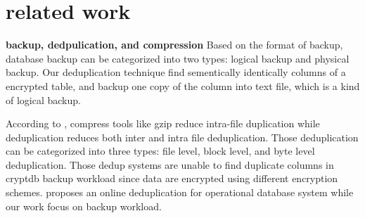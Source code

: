 \section{related work}



\textbf{backup, dedpulication, and compression} Based on the format of backup, database backup can be categorized into two types: logical backup and physical backup\citep{mysqlbackup}. Our deduplication technique find sementically identically columns of a encrypted table, and backup one copy of the column into text file, which is a kind of logical backup. 


According to \citep{mandagere2008demystifying}, compress tools like gzip reduce intra-file duplication while deduplication reduces both inter and intra file deduplication. 
Those deduplication can be categorized into three types: file level, block level, and byte level deduplication. Those dedup systems are unable to find duplicate columns in cryptdb backup workload since data are encrypted using different encryption schemes.\citep{xu2017online} proposes an online deduplication for operational database system while our work focus on backup workload.






